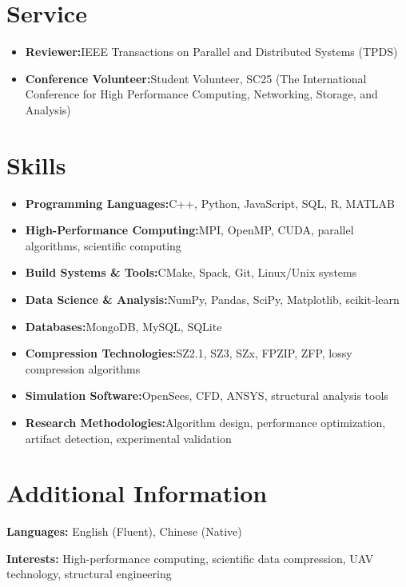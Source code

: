 \documentclass[a4paper,11pt]{article}
\newcommand{\resumeItem}[2]{
  \item{
    \textbf{#1}{\hspace{0.5mm}#2 \vspace{-0.5mm}}
  }
}
\newcommand{\resumeSubItem}[2]{\resumeItem{#1}{#2}\vspace{-4pt}}
\newcommand{\resumeHeadingSkillStart}{\begin{itemize}[leftmargin=*,itemsep=1.7mm, rightmargin=2ex]}
\newcommand{\resumeHeadingSkillEnd}{\end{itemize}\vspace{-2mm}}
\begin{document}
\section{\textbf{Service}}
\vspace{-0.4mm}
 \resumeHeadingSkillStart
  \resumeSubItem{Reviewer:}
    {IEEE Transactions on Parallel and Distributed Systems (TPDS)}
  \resumeSubItem{Conference Volunteer:}
    {Student Volunteer, SC25 (The International Conference for High Performance Computing, Networking, Storage, and Analysis)}
 \resumeHeadingSkillEnd

\section{\textbf{Skills}}
\vspace{-0.4mm}
 \resumeHeadingSkillStart
  \resumeSubItem{Programming Languages:}
    {C++, Python, JavaScript, SQL, R, MATLAB}
  \resumeSubItem{High-Performance Computing:}
    {MPI, OpenMP, CUDA, parallel algorithms, scientific computing}
  \resumeSubItem{Build Systems \& Tools:}
    {CMake, Spack, Git, Linux/Unix systems}
  \resumeSubItem{Data Science \& Analysis:}
    {NumPy, Pandas, SciPy, Matplotlib, scikit-learn}
\resumeSubItem{Databases:}
    {MongoDB, MySQL, SQLite}
  \resumeSubItem{Compression Technologies:}
    {SZ2.1, SZ3, SZx, FPZIP, ZFP, lossy compression algorithms}
  \resumeSubItem{Simulation Software:}
    {OpenSees, CFD, ANSYS, structural analysis tools}
  \resumeSubItem{Research Methodologies:}
    {Algorithm design, performance optimization, artifact detection, experimental validation}
 \resumeHeadingSkillEnd


\section{\textbf{Additional Information}}
\vspace{-0.4mm}
\small{
\textbf{Languages:} English (Fluent), Chinese (Native)

\textbf{Interests:} High-performance computing, scientific data compression, UAV technology, structural engineering
}
\vspace{-4mm}
\end{document}
